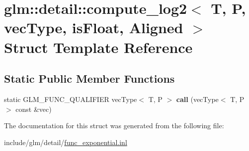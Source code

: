 \hypertarget{structglm_1_1detail_1_1compute__log2}{}\section{glm\+:\+:detail\+:\+:compute\+\_\+log2$<$ T, P, vec\+Type, is\+Float, Aligned $>$ Struct Template Reference}
\label{structglm_1_1detail_1_1compute__log2}
\subsection*{Static Public Member Functions}
\begin{DoxyCompactItemize}
\item 
\mbox{\label{structglm_1_1detail_1_1compute__log2_a1ed6d8be264cc5602a6808d3574bdb06}} 
static G\+L\+M\+\_\+\+F\+U\+N\+C\+\_\+\+Q\+U\+A\+L\+I\+F\+I\+ER vec\+Type$<$ T, P $>$ {\bfseries call} (vec\+Type$<$ T, P $>$ const \&vec)
\end{DoxyCompactItemize}


The documentation for this struct was generated from the following file\+:\begin{DoxyCompactItemize}
\item 
include/glm/detail/\hyperlink{func__exponential_8inl}{func\+\_\+exponential.\+inl}\end{DoxyCompactItemize}
